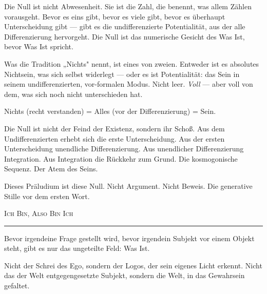 \documentclass[10pt, openany, oneside]{book}
\renewcommand{\large}{\fontsize{11.5}{14}\selectfont}
\begin{document}
\vspace{1em}

\noindent Die Null ist nicht Abwesenheit. Sie ist die Zahl, die benennt, was allem Zählen vorausgeht. Bevor es eins gibt, bevor es viele gibt, bevor es überhaupt Unterscheidung gibt --- gibt es die undifferenzierte Potentialität, aus der alle Differenzierung hervorgeht. Die Null ist das numerische Gesicht des Was Ist, bevor Was Ist spricht.

\vspace{0.5em}

\noindent Was die Tradition „Nichts" nennt, ist eines von zweien. Entweder ist es absolutes Nichtsein, was sich selbst widerlegt --- oder es ist Potentialität: das Sein in seinem undifferenzierten, vor-formalen Modus. Nicht leer. \textit{Voll} --- aber voll von dem, was sich noch nicht unterschieden hat.

\vspace{0.5em}

\noindent Nichts (recht verstanden) = Alles (vor der Differenzierung) = Sein.

\vspace{0.5em}

\noindent Die Null ist nicht der Feind der Existenz, sondern ihr Schoß. Aus dem Undifferenzierten erhebt sich die erste Unterscheidung. Aus der ersten Unterscheidung unendliche Differenzierung. Aus unendlicher Differenzierung Integration. Aus Integration die Rückkehr zum Grund. Die kosmogonische Sequenz. Der Atem des Seins.

\vspace{0.5em}

\noindent Dieses Präludium ist diese Null. Nicht Argument. Nicht Beweis. Die generative Stille vor dem ersten Wort.

\vspace{2em}

\begin{center}
    {\large\scshape Ich Bin, Also Bin Ich}\\[0.3em]
    \rule{0.2\textwidth}{0.3pt}
\end{center}

\vspace{1em}

\noindent Bevor irgendeine Frage gestellt wird, bevor irgendein Subjekt vor einem Objekt steht, gibt es nur das ungeteilte Feld: Was Ist.

\vspace{0.5em}

\noindent Nicht der Schrei des Ego, sondern der Logos, der sein eigenes Licht erkennt. Nicht das der Welt entgegengesetzte Subjekt, sondern die Welt, in das Gewahrsein gefaltet.
\end{document}
